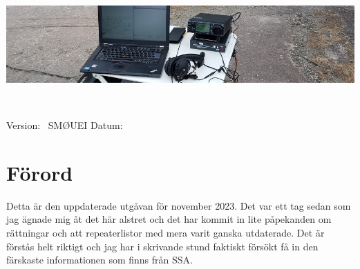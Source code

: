 

\pagestyle{empty}
\vfill
\vspace*{4cm}
\centerline{\includegraphics[width=\paperwidth]{logo/rubrikbild}}
\begin{flushright}
	\Huge{\bfseries{\TitleText}} \\[3mm]
	\Large{\bfseries{\SubtitleText}}
\end{flushright}

\vfill
	
Version: \DokVersion\ \hfill SMØUEI \hfill Datum: \DokumentDatum

\newpage


\pagestyle{fancy}
\lhead{\leftmark}

\chead{}


\cfoot{\scriptsize \thepage\ / \pageref{LastPage}}


\renewcommand{\footrulewidth}{0.2pt}



\cleardoublepage

\tableofcontents

\newpage

\setlength{\parskip}{0.5em}
\setlength{\parindent}{0pt}

\section*{Förord}
	
Detta är den uppdaterade utgåvan för november 2023. Det var ett tag
sedan som jag ägnade mig åt det här alstret och det har kommit in lite
påpekanden om rättningar och att repeaterlistor med mera varit ganska
utdaterade. Det är förstås helt riktigt och jag har i skrivande stund
faktiskt försökt få in den färskaste informationen som finns från SSA.

